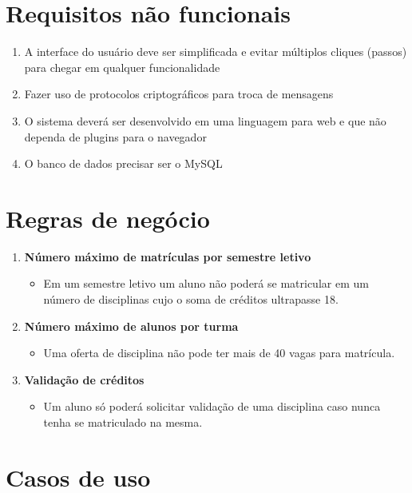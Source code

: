 \documentclass[11pt]{report}
\begin{document}
\section{Requisitos não funcionais}

\begin{enumerate}
	\item A interface do usuário deve ser simplificada e evitar múltiplos cliques (passos) para chegar em qualquer funcionalidade
	\item Fazer uso de protocolos criptográficos para troca de mensagens
	\item O sistema deverá ser desenvolvido em uma linguagem para web e que não dependa de plugins para o navegador
	\item O banco de dados precisar ser o MySQL
\end{enumerate}

\section{Regras de negócio}

\begin{enumerate}
	\item \textbf{Número máximo de matrículas por semestre letivo}
	\begin{itemize}
		\item Em um semestre letivo um aluno não poderá se matricular em um número de disciplinas cujo o soma de créditos ultrapasse 18.
	\end{itemize}
	\item \textbf{Número máximo de alunos por turma}
	\begin{itemize}
		\item Uma oferta de disciplina não pode ter mais de 40 vagas para matrícula.
	\end{itemize}
	\item \textbf{Validação de créditos}
	\begin{itemize}
		\item Um aluno só poderá solicitar validação de uma disciplina caso nunca tenha se matriculado na mesma.
	\end{itemize}
\end{enumerate}

\section{Casos de uso}

\newcommand{\casodeuso}{\refstepcounter{uc}UC.\arabic{uc}}
\end{document}
